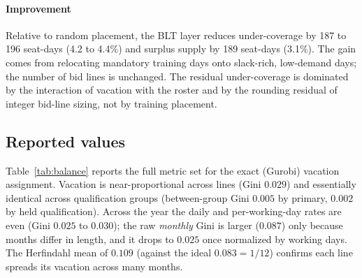 \documentclass[preprint,12pt]{elsarticle}
\begin{document}
   \paragraph{Improvement} Relative to random placement, the BLT layer reduces under-coverage by 187 to 196 seat-days (4.2 to 4.4\%) and surplus supply by 189 seat-days (3.1\%). The gain comes from relocating mandatory training days onto slack-rich, low-demand days; the number of bid lines is unchanged. The residual under-coverage is dominated by the interaction of vacation with the roster and by the rounding residual of integer bid-line sizing, not by training placement.

   \subsection{Reported values}\label{subsec:reported_values}
      Table~\ref{tab:balance} reports the full metric set for the exact (Gurobi) vacation assignment. Vacation is near-proportional across lines (Gini $0.029$) and essentially identical across qualification groups (between-group Gini $0.005$ by primary, $0.002$ by held qualification). Across the year the daily and per-working-day rates are even (Gini $0.025$ to $0.030$); the raw \emph{monthly} Gini is larger ($0.087$) only because months differ in length, and it drops to $0.025$ once normalized by working days. The Herfindahl mean of $0.109$ (against the ideal $0.083=1/12$) confirms each line spreads its vacation across many months.
\end{document}
